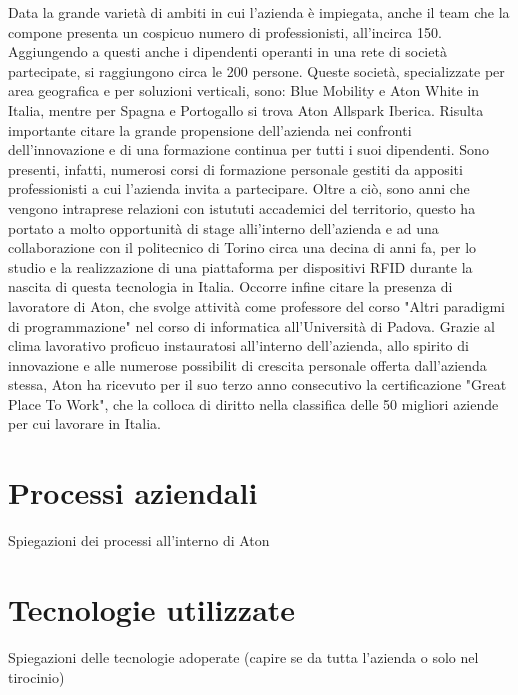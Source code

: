 Data la grande varietà di ambiti in cui l'azienda è impiegata, anche il team che la compone presenta un cospicuo numero di professionisti, all'incirca 150. 
Aggiungendo a questi anche i dipendenti operanti in una rete di società partecipate, si raggiungono circa le 200 persone. 
Queste società, specializzate per area geografica e per soluzioni verticali, sono: ​Blue Mobility e Aton White in Italia,
mentre per Spagna e Portogallo si trova Aton Allspark Iberica.
Risulta importante citare la grande propensione dell'azienda nei confronti dell'innovazione e di una formazione continua per tutti i suoi dipendenti.
Sono presenti, infatti, numerosi corsi di formazione personale gestiti da appositi professionisti a cui l'azienda invita a partecipare. Oltre a ciò,
sono anni che vengono intraprese relazioni con istututi accademici del territorio, questo ha portato a molto opportunità di stage alli'interno dell'azienda
e ad una collaborazione con il politecnico di Torino circa una decina di anni fa, per lo studio e la realizzazione di una piattaforma per dispositivi RFID
durante la nascita di questa tecnologia in Italia. Occorre infine citare la presenza di lavoratore di Aton, che svolge attività come professore del corso
"Altri paradigmi di programmazione" nel corso di informatica all'Università di Padova.
Grazie al clima lavorativo proficuo instauratosi all'interno dell'azienda, allo spirito di innovazione e alle numerose possibilit di crescita personale
offerta dall'azienda stessa, Aton ha ricevuto per il suo terzo anno consecutivo la certificazione "Great Place To Work", che la colloca di diritto
nella classifica delle 50 migliori aziende per cui lavorare in Italia.

\section{Processi aziendali}

Spiegazioni dei processi all'interno di Aton

\section{Tecnologie utilizzate}

Spiegazioni delle tecnologie adoperate (capire se da tutta l'azienda o solo nel tirocinio)

